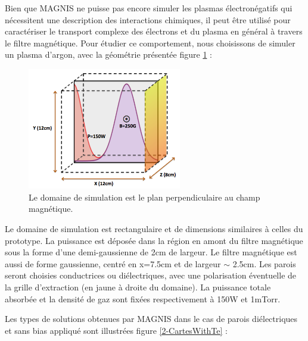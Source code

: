 \begin{refsection}
Bien que MAGNIS ne puisse pas encore simuler les plasmas électronégatifs qui
nécessitent une description des interactions chimiques, il peut être utilisé
pour caractériser le transport complexe des électrons et du plasma en général à
travers le filtre magnétique. Pour étudier ce comportement, nous choisissons de
simuler un plasma d'argon, avec la géométrie présentée figure
\ref{4-pegasesSimDomain} :
\begin{figure}[htbp]
\centering
\includegraphics[width=0.6\textwidth]{figures/4-pegasesSimDomain.png}
{\caption{Le domaine de simulation est le plan perpendiculaire au champ
magnétique.}
\label{4-pegasesSimDomain}}
\end{figure}

Le domaine de simulation est rectangulaire et de
dimensions similaires à celles du prototype. La puissance est déposée dans la
région en amont du filtre magnétique sous la forme d'une demi-gaussienne de 2cm
de largeur. Le filtre magnétique est aussi de forme gaussienne, centré en
x=7.5cm et de largeur $\sim$ 2.5cm. Les parois seront choisies
conductrices ou diélectriques, avec une polarisation éventuelle de la grille
d'extraction (en jaune à droite du domaine). La puissance totale absorbée et la
densité de gaz sont fixées respectivement à 150W et 1mTorr.

Les types de solutions obtenues par MAGNIS dans le cas de parois diélectriques
et sans bias appliqué sont illustrées figure \ref{2-CartesWithTe} :


\end{refsection}
